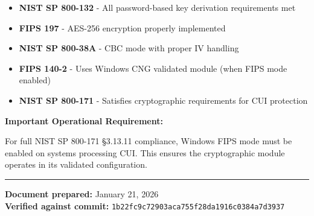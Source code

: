 \documentclass[11pt,letterpaper]{article}
\begin{document}
\begin{itemize}
    \item \textbf{NIST SP 800-132} - All password-based key derivation requirements met
    \item \textbf{FIPS 197} - AES-256 encryption properly implemented
    \item \textbf{NIST SP 800-38A} - CBC mode with proper IV handling
    \item \textbf{FIPS 140-2} - Uses Windows CNG validated module (when FIPS mode enabled)
    \item \textbf{NIST SP 800-171} - Satisfies cryptographic requirements for CUI protection
\end{itemize}

\textbf{Important Operational Requirement:}

For full NIST SP 800-171 \S3.13.11 compliance, Windows FIPS mode must be enabled on systems processing CUI. This ensures the cryptographic module operates in its validated configuration.

\vspace{24pt}

\noindent\rule{\textwidth}{0.5pt}

\textbf{Document prepared:} January 21, 2026 \\
\textbf{Verified against commit:} \texttt{1b22fc9c72903aca755f28da1916c0384a7d3937}
\end{document}

